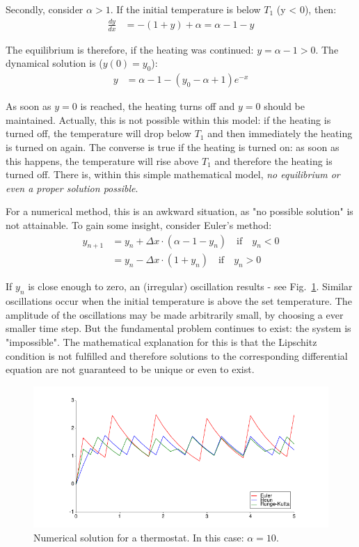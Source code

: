 \documentclass[onecolumn]{article}
\begin{document}
Secondly, consider $\alpha > 1$. If the initial temperature is below $T_1$ (y < 0), then:
%
\begin{align}
    \frac{dy}{dx} &= -(1 + y) + \alpha = \alpha - 1 - y
\end{align}

The equilibrium is therefore, if the heating was continued: $y = \alpha - 1 > 0$. The dynamical
solution is ($y(0) = y_0$):
%
\begin{align}
    y &= \alpha - 1 - (y_0 - \alpha + 1) e^{-x}
\end{align}

As soon as $y = 0$ is reached, the heating turns off and $y = 0$ should be maintained. Actually,
this is not possible within this model: if the heating is turned off, the temperature will drop below
$T_1$ and then immediately the heating is turned on again. The converse is true if the heating is turned on:
as soon as this happens, the temperature will rise above $T_1$ and therefore the heating is turned off.
There is, within this simple mathematical model, \emph{no equilibrium or even a proper solution possible}.

For a numerical method, this is an awkward situation, as "no possible solution" is not attainable. To gain
some insight, consider Euler's method:
%
\begin{align}
    y_{n+1} &= y_n + \Delta x \cdot (\alpha - 1 - y_n) \quad \text{if} \quad y_n < 0 \\
            &= y_n - \Delta x \cdot (1 + y_n)          \quad \text{if} \quad y_n > 0
\end{align}

If $y_n$ is close enough to zero, an (irregular) oscillation results - see Fig.~\ref{figThermostat}.
Similar oscillations occur when the initial temperature is above the set temperature.
The amplitude of the oscillations may be made arbitrarily small, by choosing a ever smaller time step.
But the fundamental problem continues to exist: the system is "impossible". The mathematical explanation
for this is that the Lipschitz condition is not fulfilled and therefore solutions to the corresponding
differential equation are not guaranteed to be unique or even to exist.

\begin{figure}
\begin{center}
\includegraphics{thermostat.pdf}
\caption{Numerical solution for a thermostat. In this case: $\alpha = 10$.}
\label{figThermostat}
\end{center}
\end{figure}
\end{document}
